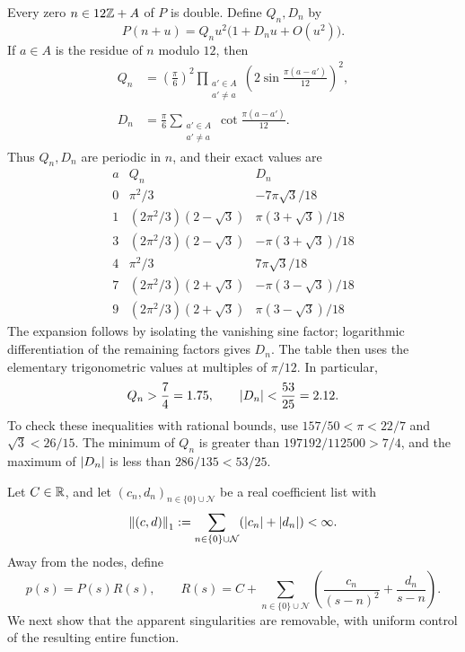 Every zero \(n\in12\mathbb Z+A\) of \(P\) is double.  Define \(Q_n,D_n\) by
\begin{equation}\label{fourier:node-expansion}
 P(n+u)=Q_nu^2\bigl(1+D_nu+O(u^2)\bigr).
\end{equation}
If \(a\in A\) is the residue of \(n\) modulo \(12\), then
\begin{equation}\label{fourier:node-data}
 \begin{split}
 Q_n&=\left(\frac\pi6\right)^2
       \prod_{\substack{a'\in A\\a'\ne a}}
       \left(2\sin\frac{\pi(a-a')}{12}\right)^2,\\
 D_n&=\frac\pi6\sum_{\substack{a'\in A\\a'\ne a}}
             \cot\frac{\pi(a-a')}{12}.
 \end{split}
\end{equation}
Thus \(Q_n,D_n\) are periodic in \(n\), and their exact values are
\[
\begin{array}{c|c|c}
 a&Q_n&D_n\\\hline
 0&\pi^2/3&-7\pi\sqrt3/18\\
 1&(2\pi^2/3)(2-\sqrt3)&\pi(3+\sqrt3)/18\\
 3&(2\pi^2/3)(2-\sqrt3)&-\pi(3+\sqrt3)/18\\
 4&\pi^2/3&7\pi\sqrt3/18\\
 7&(2\pi^2/3)(2+\sqrt3)&-\pi(3-\sqrt3)/18\\
 9&(2\pi^2/3)(2+\sqrt3)&\pi(3-\sqrt3)/18
\end{array}
\]
The expansion follows by isolating the vanishing sine factor; logarithmic
differentiation of the remaining factors gives \(D_n\).  The table then uses
the elementary trigonometric values at multiples of \(\pi/12\).
In particular,
\begin{equation}\label{fourier:node-bounds}
 Q_n>\frac74=1.75,\qquad \left\lvert D_n\right\rvert<\frac{53}{25}=2.12.
\end{equation}
To check these inequalities with rational bounds, use
\(157/50<\pi<22/7\) and \(\sqrt3<26/15\).  The minimum of \(Q_n\) is
greater than \(197192/112500>7/4\), and the maximum of \(\left\lvert D_n\right\rvert\) is
less than \(286/135<53/25\).

Let \(C\in\mathbb R\), and let \((c_n,d_n)_{n\in\{0\}\cup\mathcal N}\) be a
real coefficient list with
\begin{equation}\label{fourier:list-norm}
 \left\lVert(c,d)\right\rVert_1
 :=\sum_{n\in\{0\}\cup\mathcal N}(\left\lvert c_n\right\rvert+\left\lvert d_n\right\rvert)<\infty.
\end{equation}
Away from the nodes, define
\begin{equation}\label{fourier:cardinal}
 p(s)=P(s)R(s),\qquad
 R(s)=C+\sum_{n\in\{0\}\cup\mathcal N}
       \left(\frac{c_n}{(s-n)^2}+\frac{d_n}{s-n}\right).
\end{equation}
We next show that the apparent singularities are removable, with uniform
control of the resulting entire function.

